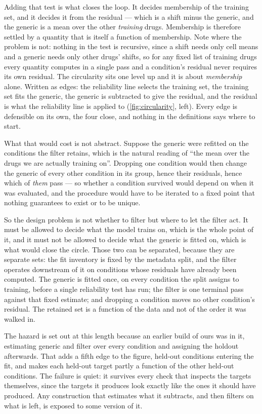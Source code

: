 Adding that test is what closes the loop. It decides membership of the training
set, and it decides it from the residual --- which is a shift minus the generic,
and the generic is a mean over the other \emph{training} drugs. Membership is
therefore settled by a quantity that is itself a function of membership. Note
where the problem is not: nothing in the test is recursive, since a shift needs
only cell means and a generic needs only other drugs' shifts, so for any fixed
list of training drugs every quantity computes in a single pass and a condition's
residual never requires its own residual. The circularity sits one level up and it
is about \emph{membership} alone. Written as edges: the reliability line selects
the training set, the training set fits the generic, the generic is subtracted to
give the residual, and the residual is what the reliability line is applied to
(\cref{fig:circularity}, left). Every edge is defensible on its own, the four
close, and nothing in the definitions says where to start.

What that would cost is not abstract. Suppose the generic were refitted on the
conditions the filter retains, which is the natural reading of ``the mean over the
drugs we are actually training on''. Dropping one condition would then change the
generic of every other condition in its group, hence their residuals, hence which
of \emph{them} pass --- so whether a condition survived would depend on when it
was evaluated, and the procedure would have to be iterated to a fixed point that
nothing guarantees to exist or to be unique.

So the design problem is not whether to filter but where to let the filter act. It
must be allowed to decide what the model trains on, which is the whole point of
it, and it must not be allowed to decide what the generic is fitted on, which is
what would close the circle. Those two can be separated, because they are separate
sets: the fit inventory is fixed by the metadata split, and the filter operates
downstream of it on conditions whose residuals have already been computed. The
generic is fitted once, on every condition the split assigns to training, before a
single reliability test has run; the filter is one terminal pass against that
fixed estimate; and dropping a condition moves no other condition's residual. The
retained set is a function of the data and not of the order it was walked in.

The hazard is set out at this length because an earlier build of ours was in it,
estimating generic and filter over every condition and assigning the holdout
afterwards. That adds a fifth edge to the figure, held-out conditions entering the
fit, and makes each held-out target partly a function of the other held-out
conditions. The failure is quiet: it survives every check that inspects the
targets themselves, since the targets it produces look exactly like the ones it
should have produced. Any construction that estimates what it subtracts, and then
filters on what is left, is exposed to some version of it.

